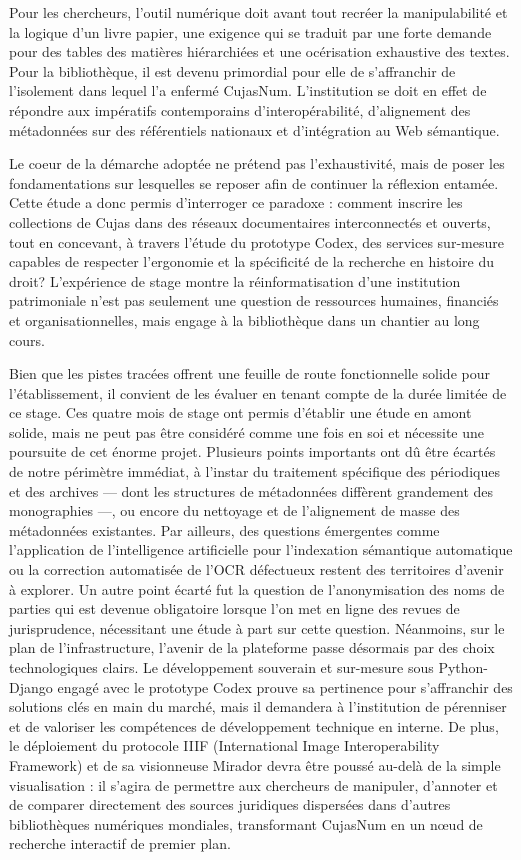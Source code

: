 Pour les chercheurs, l'outil numérique doit avant tout recréer la manipulabilité et la logique d'un livre papier, une exigence qui se traduit par une forte demande pour des tables des matières hiérarchiées et une océrisation exhaustive des textes. Pour la bibliothèque, il est devenu primordial pour elle de s'affranchir de l'isolement dans lequel l'a enfermé CujasNum. L'institution se doit en effet de répondre aux impératifs contemporains d'interopérabilité, d'alignement des métadonnées sur des référentiels nationaux et d'intégration au Web sémantique.

Le coeur de la démarche adoptée ne prétend pas l'exhaustivité, mais de poser les fondamentations sur lesquelles se reposer afin de continuer la réflexion entamée. Cette étude a donc permis d'interroger ce paradoxe : comment inscrire les collections de Cujas dans des réseaux documentaires interconnectés et ouverts, tout en concevant, à travers l'étude du prototype Codex, des services sur-mesure capables de respecter l'ergonomie et la spécificité de la recherche en histoire du droit? L'expérience de stage montre la réinformatisation d'une institution patrimoniale n'est pas seulement une question de ressources humaines, financiés et organisationnelles, mais engage à la bibliothèque dans un chantier au long cours. 

Bien que les pistes tracées offrent une feuille de route fonctionnelle solide pour l'établissement, il convient de les évaluer en tenant compte de la durée limitée de ce stage. Ces quatre mois de stage ont permis d'établir une étude en amont solide, mais ne peut pas être considéré comme une fois en soi et nécessite une poursuite de cet énorme projet. Plusieurs points importants ont dû être écartés de notre périmètre immédiat, à l'instar du traitement spécifique des périodiques et des archives — dont les structures de métadonnées diffèrent grandement des monographies —, ou encore du nettoyage et de l'alignement de masse des métadonnées existantes. Par ailleurs, des questions émergentes comme l'application de l'intelligence artificielle pour l'indexation sémantique automatique ou la correction automatisée de l'OCR défectueux restent des territoires d'avenir à explorer. Un autre point écarté fut la question de l'anonymisation des noms de parties qui est devenue obligatoire lorsque l'on met en ligne des revues de jurisprudence, nécessitant une étude à part sur cette question.
Néanmoins, sur le plan de l'infrastructure, l'avenir de la plateforme passe désormais par des choix technologiques clairs. Le développement souverain et sur-mesure sous Python-Django engagé avec le prototype Codex prouve sa pertinence pour s'affranchir des solutions clés en main du marché, mais il demandera à l'institution de pérenniser et de valoriser les compétences de développement technique en interne. De plus, le déploiement du protocole IIIF (International Image Interoperability Framework) et de sa visionneuse Mirador devra être poussé au-delà de la simple visualisation : il s'agira de permettre aux chercheurs de manipuler, d'annoter et de comparer directement des sources juridiques dispersées dans d'autres bibliothèques numériques mondiales, transformant CujasNum en un nœud de recherche interactif de premier plan.

